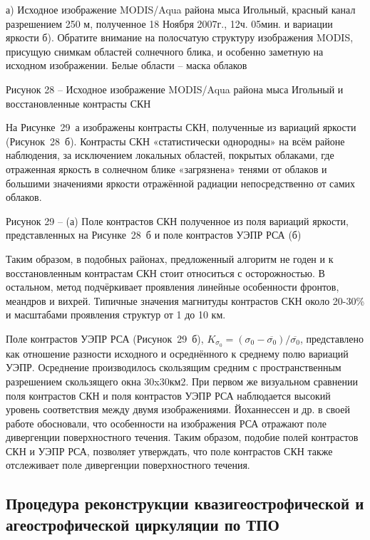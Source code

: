 а) Исходное изображение MODIS/Aqua района мыса Игольный, красный канал разрешением 250 м, полученное 18 Ноября 2007г., 12ч. 05мин. и вариации яркости б). Обратите внимание на полосчатую структуру изображения MODIS, присущую снимкам областей солнечного блика, и особенно заметную на исходном изображении. Белые области -- маска облаков



Рисунок 28 -- Исходное изображение MODIS/Aqua района мыса Игольный и восстановленные контрасты СКН



На Рисунке~29~а изображены контрасты СКН, полученные из вариаций яркости (Рисунок~28~б). Контрасты СКН «статистически однородны» на всём районе наблюдения, за исключением локальных областей, покрытых облаками, где отраженная яркость в солнечном блике «загрязнена» тенями от облаков и большими значениями яркости отражённой радиации непосредственно от самих облаков. 



Рисунок 29 -- (а) Поле контрастов СКН полученное из поля вариаций яркости, представленных на Рисунке~28~б и поле контрастов УЭПР РСА (б)



Таким образом, в подобных районах, предложенный алгоритм не годен и к восстановленным контрастам СКН стоит относиться с осторожностью. В остальном, метод подчёркивает проявления линейные особенности фронтов, меандров и вихрей. Типичные значения магнитуды контрастов СКН около 20-30\% и масштабами проявления структур от 1 до 10 км.

Поле контрастов УЭПР РСА (Рисунок~29~б), $K_{\sigma _{0} } =(\sigma _{0} -\overline{\sigma _{0} })/\overline{\sigma _{0} }$, представлено как отношение разности исходного и осреднённого к среднему полю вариаций УЭПР. Осреднение производилось скользящим средним с пространственным разрешением скользящего окна 30x30км2. При первом же визуальном сравнении поля контрастов СКН и поля контрастов УЭПР РСА наблюдается высокий уровень соответствия между двумя изображениями. Йоханнессен и др. в своей работе обосновали, что особенности на изображения РСА отражают поле дивергенции поверхностного течения. Таким образом, подобие полей контрастов СКН и УЭПР РСА, позволяет утверждать, что поле контрастов СКН также отслеживает поле дивергенции поверхностного течения.



\subsection{Процедура реконструкции квазигеострофической и агеострофической циркуляции по ТПО} \label{sec:3.2.2}


